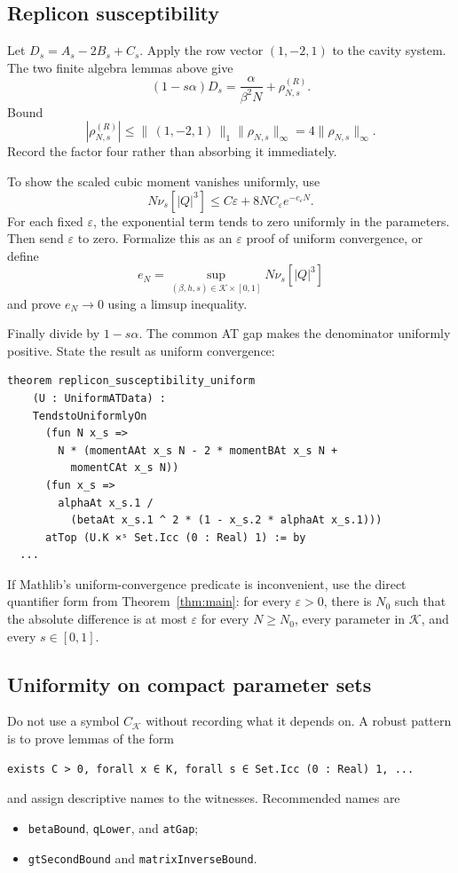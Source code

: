 \documentclass[11pt]{article}
\numberwithin{equation}{section}
\newcommand{\1}{\mathbf 1}
\begin{document}
\subsection{Replicon susceptibility}

Let $D_s=A_s-2B_s+C_s$.  Apply the row vector $(1,-2,1)$ to the cavity
system.  The two finite algebra lemmas above give
\[
 (1-s\alpha)D_s
 =\frac{\alpha}{\beta^2N}+\rho^{(R)}_{N,s}.
\]
Bound
\[
 |\rho^{(R)}_{N,s}|
 \le \|\,(1,-2,1)\,\|_1\|\rho_{N,s}\|_\infty
 =4\|\rho_{N,s}\|_\infty.
\]
Record the factor four rather than absorbing it immediately.

To show the scaled cubic moment vanishes uniformly, use
\[
 N\nu_s[|Q|^3]
 \le C\varepsilon+
 8NC_{\varepsilon}e^{-c_{\varepsilon}N}.
\]
For each fixed $\varepsilon$, the exponential term tends to zero uniformly
in the parameters.  Then send $\varepsilon$ to zero.  Formalize this as an
$\varepsilon$ proof of uniform convergence, or define
\[
 e_N=\sup_{(\beta,h,s)\in\mathcal K\times[0,1]}
      N\nu_s[|Q|^3]
\]
and prove $e_N\to0$ using a limsup inequality.

Finally divide by $1-s\alpha$.  The common AT gap makes the denominator
uniformly positive.  State the result as uniform convergence:
\begin{lstlisting}
theorem replicon_susceptibility_uniform
    (U : UniformATData) :
    TendstoUniformlyOn
      (fun N x_s =>
        N * (momentAAt x_s N - 2 * momentBAt x_s N +
          momentCAt x_s N))
      (fun x_s =>
        alphaAt x_s.1 /
          (betaAt x_s.1 ^ 2 * (1 - x_s.2 * alphaAt x_s.1)))
      atTop (U.K ×ˢ Set.Icc (0 : Real) 1) := by
  ...
\end{lstlisting}
If Mathlib's uniform-convergence predicate is inconvenient, use the direct
quantifier form from Theorem~\ref{thm:main}:
for every $\varepsilon>0$, there is $N_0$ such that the absolute difference
is at most $\varepsilon$ for every $N\ge N_0$, every parameter in
$\mathcal K$, and every $s\in[0,1]$.

\subsection{Uniformity on compact parameter sets}

Do not use a symbol $C_{\mathcal K}$ without recording what it depends on.
A robust pattern is to prove lemmas of the form
\begin{lstlisting}
exists C > 0, forall x ∈ K, forall s ∈ Set.Icc (0 : Real) 1, ...
\end{lstlisting}
and assign descriptive names to the witnesses.  Recommended names are
\begin{itemize}[leftmargin=2em]
\item \texttt{betaBound}, \texttt{qLower}, and \texttt{atGap};
\item \texttt{gtSecondBound} and \texttt{matrixInverseBound}.
\end{itemize}
\end{document}
